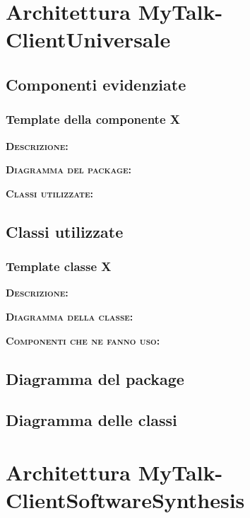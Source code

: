 \section{Architettura MyTalk-ClientUniversale}

\subsection{Componenti evidenziate}

\subsubsection{Template della componente X}
\begin{description}
	\item{\scshape\bfseries Descrizione:} 
	\item{\scshape\bfseries Diagramma del package:}
	\item{\scshape\bfseries Classi utilizzate:} 
\end{description}

\subsection{Classi utilizzate}

\subsubsection{Template classe X}
\begin{description}
	\item{\scshape\bfseries Descrizione:} 
	\item{\scshape\bfseries Diagramma della classe:}
	\item{\scshape\bfseries Componenti che ne fanno uso:} 
\end{description}

\subsection{Diagramma del package}

\subsection{Diagramma delle classi}
\clearpage

\section{Architettura MyTalk-ClientSoftwareSynthesis}

